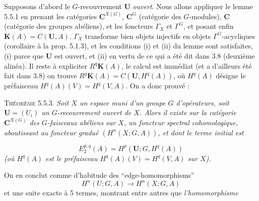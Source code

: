 Supposons d'abord le $G$-recouvrement ${\mathbf U}$ \textit{ouvert}. Nous allons appliquer
le lemme 5.5.1 en prenant les catégories ${\mathbf C}^{X(G)}$, ${\mathbf C}^G$ (catégorie des
$G$-modules), ${\mathbf C}$ (catégorie des groupes abéliens), et les foncteurs
$\Gamma_X$ et $\Gamma^G$, et posant enfin $\mathbf K(A)=C({\mathbf U},A)$.
$\Gamma_X$ transforme bien objets injectifs en objets $\Gamma^G$-acycliques
(corollaire à la prop. 5.1.3), et les conditions (i) et (ii) du lemme sont
satisfaites, (i) parce que ${\mathbf U}$ est ouvert, et (ii) en vertu de ce qui a
été dit dans 3.8 (deuxième alinéa). Il reste à expliciter $R^q\mathbf K(A)$, le
calcul est immédiat (et a d'ailleurs été fait dans 3.8) on trouve
$R^q\mathbf K(A)=C({\mathbf U},H^q(A))$, où $H^q(A)$ désigne le préfaisceau
$H^q(A)(V)=H^q(V,A)$. On a donc prouvé :

\textsc{Théorème 5.5.3.} \textit{Soit $X$ un espace muni d'un groupe
$G$ d'opérateurs, soit ${\mathbf U}=(U_i)$ un $G$-recouvrement ouvert de $X$.
Alors il existe sur la catégorie ${\mathbf C}^{X(G)}$ des $G$-faisceaux abéliens sur $X$,
un foncteur spectral cohomologique, aboutissant au foncteur gradué
$(H^n(X;G,A))$, et dont le terme initial est}

\[
\tag{5.5.4}
E_2^{p,q}(A)=H^p({\mathbf U};G,H^q(A))
\]
\textit{(où $H^q(A)$ est le préfaisceau $H^q(A)(V)=H^q(V,A)$ sur $X$).}

On en conclut comme d'habitude des ``edge-homomorphisms''
\[
\tag{5.5.5}
H^n(U;G,A)\to H^n(X;G,A)
\]
et une suite exacte à 5 termes, montrant entre autres que \textit{l'homomorphisme}

